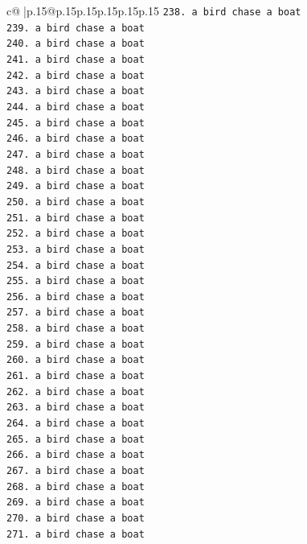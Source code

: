 \documentclass{article}
\begin{document}
{\begin{supertabular}{c@{$\;$}|p{.15\linewidth}@{}p{.15\linewidth}p{.15\linewidth}p{.15\linewidth}p{.15\linewidth}p{.15\linewidth}}
{{{\texttt{238. a bird chase a boat} \\
\texttt{239. a bird chase a boat} \\
\texttt{240. a bird chase a boat} \\
\texttt{241. a bird chase a boat} \\
\texttt{242. a bird chase a boat} \\
\texttt{243. a bird chase a boat} \\
\texttt{244. a bird chase a boat} \\
\texttt{245. a bird chase a boat} \\
\texttt{246. a bird chase a boat} \\
\texttt{247. a bird chase a boat} \\
\texttt{248. a bird chase a boat} \\
\texttt{249. a bird chase a boat} \\
\texttt{250. a bird chase a boat} \\
\texttt{251. a bird chase a boat} \\
\texttt{252. a bird chase a boat} \\
\texttt{253. a bird chase a boat} \\
\texttt{254. a bird chase a boat} \\
\texttt{255. a bird chase a boat} \\
\texttt{256. a bird chase a boat} \\
\texttt{257. a bird chase a boat} \\
\texttt{258. a bird chase a boat} \\
\texttt{259. a bird chase a boat} \\
\texttt{260. a bird chase a boat} \\
\texttt{261. a bird chase a boat} \\
\texttt{262. a bird chase a boat} \\
\texttt{263. a bird chase a boat} \\
\texttt{264. a bird chase a boat} \\
\texttt{265. a bird chase a boat} \\
\texttt{266. a bird chase a boat} \\
\texttt{267. a bird chase a boat} \\
\texttt{268. a bird chase a boat} \\
\texttt{269. a bird chase a boat} \\
\texttt{270. a bird chase a boat} \\
\texttt{271. a bird chase a boat} \\
}}}
\end{supertabular}}
\end{document}
